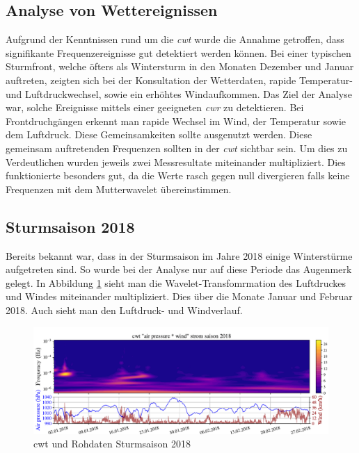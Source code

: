 \begin{refsection}
\section{Analyse von Wettereignissen}
Aufgrund der Kenntnissen rund um die \textit{cwt} wurde die Annahme getroffen, dass signifikante Frequenzereignisse gut detektiert werden können.
Bei einer typischen Sturmfront, welche öfters als Wintersturm in den Monaten Dezember und Januar auftreten, zeigten sich bei der Konsultation der Wetterdaten, rapide Temperatur- und Luftdruckwechsel, sowie ein erhöhtes Windaufkommen.
Das Ziel der Analyse war, solche Ereignisse mittels einer geeigneten \textit{cwr} zu detektieren.
Bei Frontdruchgängen erkennt man rapide Wechsel im Wind, der Temperatur sowie dem Luftdruck.
Diese Gemeinsamkeiten sollte ausgenutzt werden. Diese gemeinsam auftretenden Frequenzen sollten in der \textit{cwt} sichtbar sein.
Um dies zu Verdeutlichen wurden jeweils zwei Messresultate miteinander multipliziert.
Dies funktionierte besonders gut, da die Werte rasch gegen null divergieren falls keine Frequenzen mit dem Mutterwavelet übereinstimmen. 

\subsection{Sturmsaison 2018}
Bereits bekannt war, dass in der Sturmsaison im Jahre 2018 einige Winterstürme aufgetreten sind.
So wurde bei der Analyse nur auf diese Periode das Augenmerk gelegt. In Abbildung \ref{fig:cwt_storm} \space sieht man die Wavelet-Transfomrmation des Luftdruckes und Windes miteinander multipliziert. Dies über die Monate Januar und Februar 2018. Auch sieht man den Luftdruck- und Windverlauf.
 
\begin{figure}[]
	\centering
	\includegraphics[width=1\textwidth]{papers/wwt/images/storm_airp_wind.pdf}
	\caption{cwt und Rohdaten Sturmsaison 2018}
	\label{fig:cwt_storm}
\end{figure}


\end{refsection}
